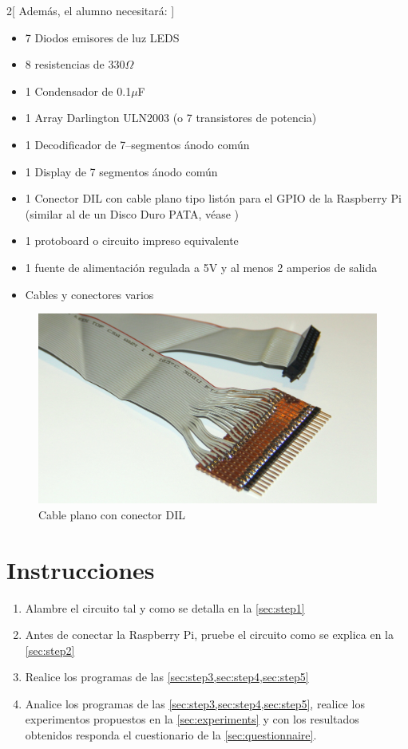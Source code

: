 \documentclass[letterpaper,10.5pt]{article}
\begin{document}
\begin{multicols}{2}[%
Además, el alumno necesitará:
]
\begin{itemize}[noitemsep]
	\item 7 Diodos emisores de luz LEDS
	\item 8 resistencias de 330$\Omega$
	\item 1 Condensador de 0.1$\mu$F
	\item 1 Array Darlington ULN2003 (o 7 transistores de potencia)
	\item 1 Decodificador de 7--segmentos ánodo común
	\item 1 Display de 7 segmentos ánodo común
	\item 1 Conector DIL con cable plano tipo listón para el GPIO de la Raspberry Pi (similar al de un Disco Duro PATA, véase  )
	\item 1 protoboard o circuito impreso equivalente
	\item 1 fuente de alimentación regulada a 5V y al menos 2 amperios de salida
	\item Cables y conectores varios
\end{itemize}
\columnbreak
\begin{figure}[H]
	\centering%
	\includegraphics[width=0.9\columnwidth]{img/p03-dil.jpg} %
	\caption{Cable plano con conector DIL}
	\label{fig:cable-dil} %
\end{figure}
\end{multicols}



\section{Instrucciones}%
\label{sec:instructions}
\begin{enumerate}[noitemsep]
	\item Alambre el circuito tal y como se detalla en la \cref{sec:step1}
	\item Antes de conectar la Raspberry Pi, pruebe el circuito como se explica en la \cref{sec:step2}
	\item Realice los programas de las \cref{sec:step3,sec:step4,sec:step5}
	\item Analice los programas de las \cref{sec:step3,sec:step4,sec:step5}, realice los experimentos propuestos en la \cref{sec:experiments} y con los resultados obtenidos responda el cuestionario de la \cref{sec:questionnaire}.
\end{enumerate}
\end{document}
